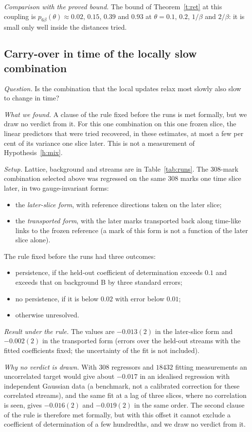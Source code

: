 \emph{Comparison with the proved bound.} The bound of Theorem~\ref{t:ret} at this coupling is
$p_{6\beta}(\theta)\approx0.02$, $0.15$, $0.39$ and $0.93$ at $\theta=0.1$, $0.2$, $1/\beta$ and $2/\beta$: it
is small only well inside the distances tried.

\subsection{Carry-over in time of the locally slow combination}\label{s:time}
\emph{Question.} Is the combination that the local updates relax most slowly also slow to change in time?

\emph{What we found.} A clause of the rule fixed before the runs is met formally, but we draw no verdict
from it. For
this one combination on this one frozen slice, the linear predictors that were tried recovered, in these estimates, at most a few
per cent of its variance one slice later. This is not a measurement of Hypothesis~\ref{h:mix}.

\emph{Setup.} Lattice, background and streams are in Table~\ref{tab:runs}. The $308$-mark combination
selected above was regressed on the same $308$ marks one time slice later, in two gauge-invariant forms:
\begin{itemize}
\item the \emph{later-slice form}, with reference directions taken on the later slice;
\item the \emph{transported form}, with the later marks transported back along time-like links to the frozen
reference (a mark of this form is not a function of the later slice alone).
\end{itemize}
The rule fixed before the runs had three outcomes:
\begin{itemize}
\item persistence, if the held-out coefficient of determination exceeds $0.1$ and exceeds that on
background \textsf{B} by three standard errors;
\item no persistence, if it is below $0.02$ with error below $0.01$;
\item otherwise unresolved.
\end{itemize}

\emph{Result under the rule.} The values are $-0.013(2)$ in the later-slice form and $-0.002(2)$ in the transported form (errors over the
held-out streams with the fitted coefficients fixed; the uncertainty of the fit is not included).

\emph{Why no verdict is drawn.} With $308$ regressors and $18432$ fitting measurements an uncorrelated target
would give about $-0.017$ in an idealised regression with independent Gaussian data (a benchmark, not a
calibrated correction for these correlated streams), and the same fit at a lag of three slices, where no correlation is seen, gives
$-0.016(2)$ and $-0.019(2)$ in the same order. The second clause of the rule is therefore met formally, but with this offset it
cannot exclude a coefficient of determination of a few hundredths, and we draw no verdict from it.

